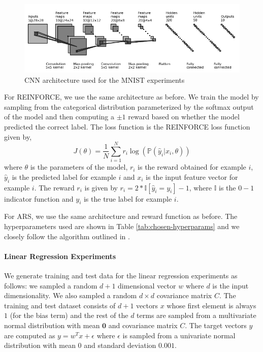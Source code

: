 \begin{figure}[H]
    \centering
    \includegraphics[width=0.9\linewidth]{figures/aistats19/conv.png}
    \caption{CNN architecture used for the MNIST experiments}
    \label{fig:arch}
\end{figure}

For REINFORCE, we use the same architecture as before. We train the model by sampling from the categorical distribution parameterized by the softmax output of the model and then computing a $\pm 1$ reward based on whether the model predicted the correct label. The loss function is the REINFORCE loss function given by,
\begin{equation}
    J(\theta) = \frac{1}{N} \sum_{i=1}^N r_i \log(\mathbb{P}(\hat y_i|x_i, \theta))
\end{equation}
where $\theta$ is the parameters of the model, $r_i$ is the reward obtained for example $i$, $\hat y_i$ is the predicted label for example $i$ and $x_i$ is the input feature vector for example $i$. The reward $r_i$ is given by $r_i = 2*\mathbb{I}[\hat y_i = y_i] - 1$, where $\mathbb{I}$ is the $0-1$ indicator function and $y_i$ is the true label for example $i$.

For ARS, we use the same architecture and reward function as before. The hyperparameters used are shown in Table \ref{tab:chosen-hyperparams} and we closely follow the algorithm outlined in \citep{mania2018simple}.

\paragraph{Linear Regression Experiments}
\label{sec:linreg-details}

We generate training and test data for the linear regression experiments as follows: we sampled a random $d+1$ dimensional vector $w$ where $d$ is the input dimensionality. We also sampled a random $d \times d$ covariance matrix $C$. The training and test dataset consists of $d+1$ vectors $x$ whose first element is always $1$ (for the bias term) and the rest of the $d$ terms are sampled from a multivariate normal distribution with mean $\mathbf{0}$ and covariance matrix $C$. The target vectors $y$ are computed as $y = w^Tx + \epsilon$ where $\epsilon$ is sampled from a univariate normal distribution with mean $0$ and standard deviation $0.001$.

